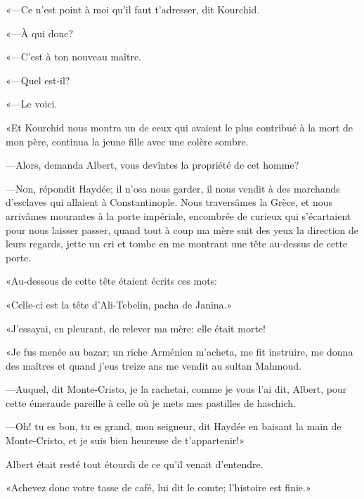 «—Ce n'est point à moi qu'il faut t'adresser, dit Kourchid. 

«—À qui donc? 

«—C'est à ton nouveau maître. 

«—Quel est-il? 

«—Le voici. 

«Et Kourchid nous montra un de ceux qui avaient le plus contribué à la mort de mon père, continua la jeune fille avec une colère sombre. 

—Alors, demanda Albert, vous devîntes la propriété de cet homme? 

—Non, répondit Haydée; il n'osa nous garder, il nous vendit à des marchands d'esclaves qui allaient à Constantinople. Nous traversâmes la Grèce, et nous arrivâmes mourantes à la porte impériale, encombrée de curieux qui s'écartaient pour nous laisser passer, quand tout à coup ma mère suit des yeux la direction de leurs regards, jette un cri et tombe en me montrant une tête au-dessus de cette porte. 

«Au-dessous de cette tête étaient écrits ces mots: 

«Celle-ci est la tête d'Ali-Tebelin, pacha de Janina.» 

«J'essayai, en pleurant, de relever ma mère: elle était morte! 

«Je fus menée au bazar; un riche Arménien m'acheta, me fit instruire, me donna des maîtres et quand j'eus treize ans me vendit au sultan Mahmoud. 

—Auquel, dit Monte-Cristo, je la rachetai, comme je vous l'ai dit, Albert, pour cette émeraude pareille à celle où je mets mes pastilles de haschich. 

—Oh! tu es bon, tu es grand, mon seigneur, dit Haydée en baisant la main de Monte-Cristo, et je suis bien heureuse de t'appartenir!» 

Albert était resté tout étourdi de ce qu'il venait d'entendre. 

«Achevez donc votre tasse de café, lui dit le comte; l'histoire est finie.» 